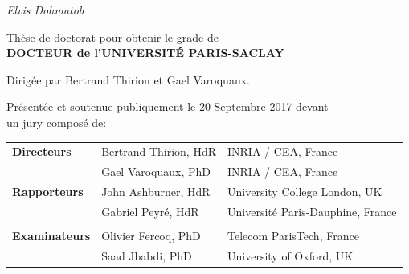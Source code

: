 \documentclass[nobib, a4paper, notoc, twoside, justified, openany]{tufte-book}
\begin{document}
\begin{titlepage}
\begin{fullwidth}
\begin{center}


\vspace{3pc}
{\Huge \it Elvis Dohmatob} \\

\vspace{3pc}



{\LARGE Thèse de doctorat pour obtenir le grade de \ \\[1ex]
{\bf DOCTEUR de l'UNIVERSIT\'E PARIS-SACLAY} \ \\
}
\vspace{1pc}

{\LARGE Dirig\'ee par {Bertrand Thirion} et {Gael Varoquaux}.}

\vspace{1pc}


{\LARGE Présentée et soutenue publiquement le 20 Septembre 2017 devant \\ \vspace{10pt} un jury composé de:}

\vspace{1pc}

{\LARGE
\begin{tabular}{lll}
\vspace{1pc}
\textbf{Directeurs} & Bertrand Thirion, HdR & INRIA / CEA, France \\
\vspace{1pc}
 & Gael Varoquaux, PhD & INRIA / CEA, France \\
\vspace{1pc}
  \textbf{Rapporteurs} & John Ashburner, HdR  & University College London, UK  \\
  \vspace{1pc}  
& Gabriel Peyr\'e, HdR  & Universit\'e Paris-Dauphine, France  \\  \\
  \vspace{1pc}
\textbf{Examinateurs} & Olivier Fercoq, PhD & Telecom ParisTech, France \\
  \vspace{1pc}
& Saad Jbabdi, PhD  & University of Oxford, UK \\  
\end{tabular}
}

\end{center}
\end{fullwidth}
\end{titlepage}
\end{document}
